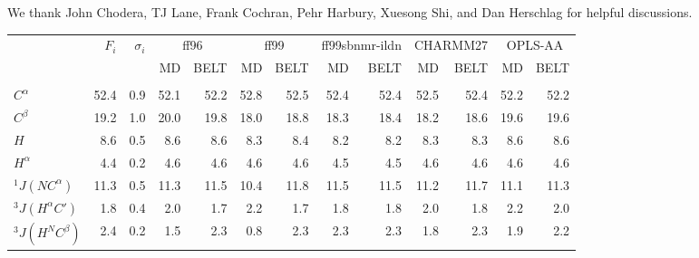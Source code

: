 \documentclass[11pt,titlepage]{article}
\begin{document}
We thank John Chodera, TJ Lane, Frank Cochran, Pehr Harbury, Xuesong Shi, and Dan Herschlag for helpful discussions.  

\clearpage

\begin{table}

\small

\begin{tabular}{lrrrrrrrrrrrr}
\toprule
   &  $F_i$ &  $\sigma_i$ &  \multicolumn{2}{c}{ff96}             &  \multicolumn{2}{c}{ff99}    &  \multicolumn{2}{c}{ff99sbnmr-ildn}   &  \multicolumn{2}{c}{CHARMM27}       &  \multicolumn{2}{c}{OPLS-AA}               \\
   &        &             &  MD   & BELT & MD   & BELT & MD   & BELT & MD   & BELT & MD   & BELT  \\
         &      &              &          &                 &          &                 &                    &                           &           &                  &         &                \\
$C^\alpha$           & 52.4 &          0.9 &     52.1 &            52.2 &     52.8 &            52.5 &               52.4 &                      52.4 &      52.5 &             52.4 &    52.2 &           52.2 \\
$C^\beta$           & 19.2 &          1.0 &     20.0 &            19.8 &     18.0 &            18.8 &               18.3 &                      18.4 &      18.2 &             18.6 &    19.6 &           19.6 \\
$H$            &  8.6 &          0.5 &      8.6 &             8.6 &      8.3 &             8.4 &                8.2 &                       8.2 &       8.3 &              8.3 &     8.6 &            8.6 \\
$H^\alpha$           &  4.4 &          0.2 &      4.6 &             4.6 &      4.6 &             4.6 &                4.5 &                       4.5 &       4.6 &              4.6 &     4.6 &            4.6 \\
$^1J(NC^\alpha)$      & 11.3 &          0.5 &     11.3 &            11.5 &     10.4 &            11.8 &               11.5 &                      11.5 &      11.2 &             11.7 &    11.1 &           11.3 \\
$^3J(H^\alpha C\prime)$ &  1.8 &          0.4 &      2.0 &             1.7 &      2.2 &             1.7 &                1.8 &                       1.8 &       2.0 &              1.8 &     2.2 &            2.0 \\
$^3J(H^NC^\beta)$     &  2.4 &          0.2 &      1.5 &             2.3 &      0.8 &             2.3 &                2.3 &                       2.3 &       1.8 &              2.3 &     1.9 &            2.2 \\

\end{tabular}
\end{table}
\end{document}

